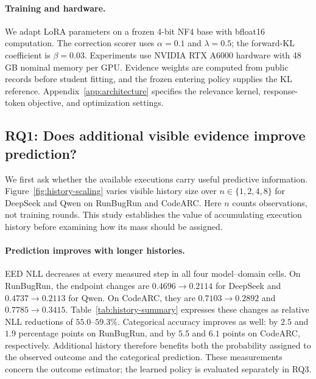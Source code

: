 \documentclass{article}
\begin{document}
\paragraph{Training and hardware.}
We adapt LoRA parameters on a frozen 4-bit NF4 base with bfloat16 computation. The correction scorer uses $\alpha=0.1$ and $\lambda=0.5$; the forward-KL coefficient is $\beta=0.03$. Experiments use NVIDIA RTX A6000 hardware with 48\,GB nominal memory per GPU. Evidence weights are computed from public records before student fitting, and the frozen entering policy supplies the KL reference. Appendix~\ref{app:architecture} specifies the relevance kernel, response-token objective, and optimization settings.

\subsection{RQ1: Does additional visible evidence improve prediction?}
\label{sec:rq1}
\label{sec:history-scaling}

We first ask whether the available executions carry useful predictive information. Figure~\ref{fig:history-scaling} varies visible history size over $n\in\{1,2,4,8\}$ for DeepSeek and Qwen on RunBugRun and CodeARC. Here $n$ counts observations, not training rounds. This study establishes the value of accumulating execution history before examining how its mass should be assigned.

\paragraph{Prediction improves with longer histories.}
EED NLL decreases at every measured step in all four model--domain cells. On RunBugRun, the endpoint changes are $0.4696\rightarrow0.2114$ for DeepSeek and $0.4737\rightarrow0.2113$ for Qwen. On CodeARC, they are $0.7103\rightarrow0.2892$ and $0.7785\rightarrow0.3415$. Table~\ref{tab:history-summary} expresses these changes as relative NLL reductions of $55.0$--$59.3\%$. Categorical accuracy improves as well: by $2.5$ and $1.9$ percentage points on RunBugRun, and by $5.5$ and $6.1$ points on CodeARC, respectively. Additional history therefore benefits both the probability assigned to the observed outcome and the categorical prediction. These measurements concern the outcome estimator; the learned policy is evaluated separately in RQ3.
\end{document}
